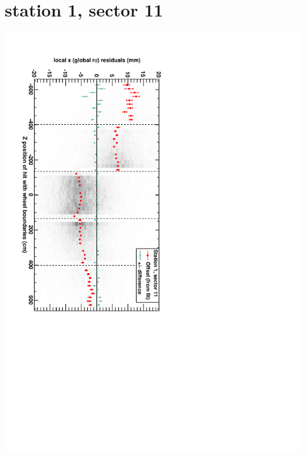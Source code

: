 \documentclass[compress]{beamer}
\begin{document}
\section*{station 1, sector 11}
\begin{frame} \vfill \mbox{\hspace{-1 cm}\includegraphics[height=1.2\linewidth, angle=90]{DTrphiVsZ_st1_sr11.pdf}} \end{frame}
\end{document}
